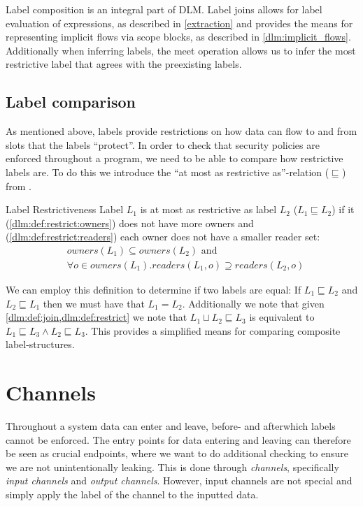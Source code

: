 Label composition is an integral part of DLM.
Label joins allows for label evaluation of expressions, as described in \cref{extraction} and provides the means for representing implicit flows via scope blocks, as described in \cref{dlm:implicit_flows}.
Additionally when inferring labels, the meet operation allows us to infer the most restrictive label that agrees with the preexisting labels.

\subsection{Label comparison}\label{dlm:comparison}
As mentioned above, labels provide restrictions on how data can flow to and from slots that the labels ``protect''.
In order to check that security policies are enforced throughout a program, we need to be able to compare how restrictive labels are.
To do this we introduce the ``at most as restrictive as''-relation ($\sqsubseteq$) from \cite{myers1997}.

\begin{definition}{Label Restrictiveness}\label{dlm:def:restrict}
  Label $L_1$ is at most as restrictive as label $L_2$ ($L_1 \sqsubseteq L_2$) if it (\ref{dlm:def:restrict:owners}) does not have more owners and (\ref{dlm:def:restrict:readers}) each owner does not have a smaller reader set:
  \begin{align}
    & owners(L_1) \subseteq owners(L_2) \text{ and} \label{dlm:def:restrict:owners} \\
    & \forall o \in owners(L_1) . readers(L_1, o) \supseteq readers(L_2, o) \label{dlm:def:restrict:readers}
  \end{align}
\end{definition}

We can employ this definition to determine if two labels are equal:
If $L_1 \sqsubseteq L_2$ and $L_2 \sqsubseteq L_1$ then we must have that $L_1 = L_2$.
Additionally we note that given \cref{dlm:def:join,dlm:def:restrict} we note that $L_1 \sqcup L_2 \sqsubseteq L_3$ is equivalent to $L_1 \sqsubseteq L_3 \wedge L_2 \sqsubseteq L_3$.
This provides a simplified means for comparing composite label-structures.

\section{Channels}\label{dlm:channels}
Throughout a system data can enter and leave, before- and afterwhich labels cannot be enforced.
The entry points for data entering and leaving can therefore be seen as crucial endpoints, where we want to do additional checking to ensure we are not unintentionally leaking.
This is done through \emph{channels}, specifically \emph{input channels} and \emph{output channels}.
However, input channels are not special and simply apply the label of the channel to the inputted data.

